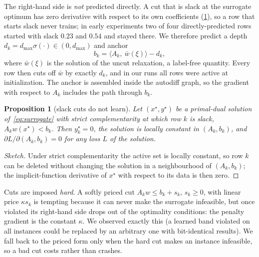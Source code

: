 \documentclass[10pt]{article}
\newtheorem{proposition}{Proposition}
\begin{document}
The right-hand side is \emph{not} predicted directly.
A cut that is slack at the surrogate optimum has zero derivative with respect to its own coefficients (\cref{prop:slack}), so a row that starts slack never trains; in early experiments two of four directly-predicted rows started with slack $0.23$ and $0.54$ and stayed there.
We therefore predict a depth $d_k=d_{\max}\sigma(\cdot)\in(0,d_{\max})$ and anchor
\begin{equation}
\label{eq:anchor}
b_k=\big\langle A_k,\ \bar w(\xi)\big\rangle-d_k,
\end{equation}
where $\bar w(\xi)$ is the solution of the uncut relaxation, a label-free quantity.
Every row then cuts off $\bar w$ by exactly $d_k$, and in our runs all rows were active at initialization.
The anchor is assembled inside the autodiff graph, so the gradient with respect to $A_k$ includes the path through $b_k$.

\begin{proposition}[slack cuts do not learn]
\label{prop:slack}
Let $(x^\star,y^\star)$ be a primal-dual solution of~\eqref{eq:surrogate} with strict complementarity at which row $k$ is slack, $A_kw(x^\star)<b_k$. Then $y_k^\star=0$, the solution is locally constant in $(A_k,b_k)$, and $\partial L/\partial(A_k,b_k)=0$ for any loss $L$ of the solution.
\end{proposition}
\begin{proof}[Sketch]
Under strict complementarity the active set is locally constant, so row $k$ can be deleted without changing the solution in a neighbourhood of $(A_k,b_k)$; the implicit-function derivative of $x^\star$ with respect to its data is then zero.
\end{proof}

Cuts are imposed \emph{hard}. A softly priced cut $A_kw\le b_k+s_k$, $s_k\ge0$, with linear price $\kappa s_k$ is tempting because it can never make the surrogate infeasible, but once violated its right-hand side drops out of the optimality conditions: the penalty gradient is the constant $\kappa$. We observed exactly this (a learned band violated on all instances could be replaced by an arbitrary one with bit-identical results). We fall back to the priced form only when the hard cut makes an instance infeasible, so a bad cut costs rather than crashes.
\end{document}
